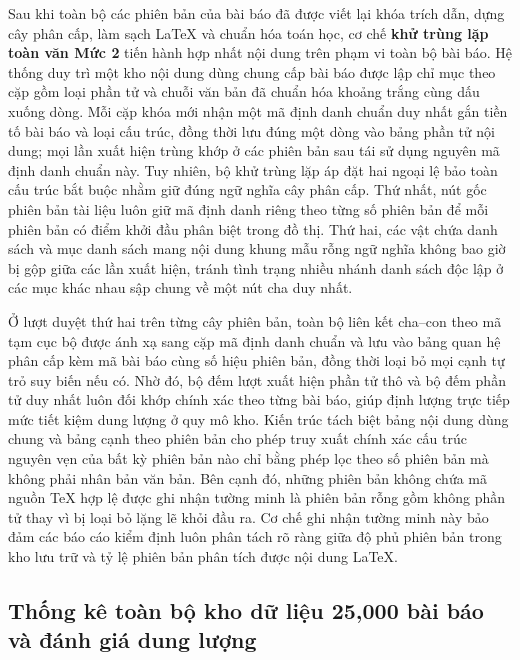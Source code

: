 Sau khi toàn bộ các phiên bản của bài báo đã được viết lại khóa trích dẫn, dựng cây phân cấp, làm sạch LaTeX và chuẩn hóa toán học, cơ chế \textbf{khử trùng lặp toàn văn Mức 2} tiến hành hợp nhất nội dung trên phạm vi toàn bộ bài báo. Hệ thống duy trì một kho nội dung dùng chung cấp bài báo được lập chỉ mục theo cặp gồm loại phần tử và chuỗi văn bản đã chuẩn hóa khoảng trắng cùng dấu xuống dòng. Mỗi cặp khóa mới nhận một mã định danh chuẩn duy nhất gắn tiền tố bài báo và loại cấu trúc, đồng thời lưu đúng một dòng vào bảng phần tử nội dung; mọi lần xuất hiện trùng khớp ở các phiên bản sau tái sử dụng nguyên mã định danh chuẩn này. Tuy nhiên, bộ khử trùng lặp áp đặt hai ngoại lệ bảo toàn cấu trúc bắt buộc nhằm giữ đúng ngữ nghĩa cây phân cấp. Thứ nhất, nút gốc phiên bản tài liệu luôn giữ mã định danh riêng theo từng số phiên bản để mỗi phiên bản có điểm khởi đầu phân biệt trong đồ thị. Thứ hai, các vật chứa danh sách và mục danh sách mang nội dung khung mẫu rỗng ngữ nghĩa không bao giờ bị gộp giữa các lần xuất hiện, tránh tình trạng nhiều nhánh danh sách độc lập ở các mục khác nhau sập chung về một nút cha duy nhất.

Ở lượt duyệt thứ hai trên từng cây phiên bản, toàn bộ liên kết cha--con theo mã tạm cục bộ được ánh xạ sang cặp mã định danh chuẩn và lưu vào bảng quan hệ phân cấp kèm mã bài báo cùng số hiệu phiên bản, đồng thời loại bỏ mọi cạnh tự trỏ suy biến nếu có. Nhờ đó, bộ đếm lượt xuất hiện phần tử thô và bộ đếm phần tử duy nhất luôn đối khớp chính xác theo từng bài báo, giúp định lượng trực tiếp mức tiết kiệm dung lượng ở quy mô kho. Kiến trúc tách biệt bảng nội dung dùng chung và bảng cạnh theo phiên bản cho phép truy xuất chính xác cấu trúc nguyên vẹn của bất kỳ phiên bản nào chỉ bằng phép lọc theo số phiên bản mà không phải nhân bản văn bản. Bên cạnh đó, những phiên bản không chứa mã nguồn TeX hợp lệ được ghi nhận tường minh là phiên bản rỗng gồm không phần tử thay vì bị loại bỏ lặng lẽ khỏi đầu ra. Cơ chế ghi nhận tường minh này bảo đảm các báo cáo kiểm định luôn phân tách rõ ràng giữa độ phủ phiên bản trong kho lưu trữ và tỷ lệ phiên bản phân tích được nội dung LaTeX.

\subsection{Thống kê toàn bộ kho dữ liệu 25,000 bài báo và đánh giá dung lượng}

